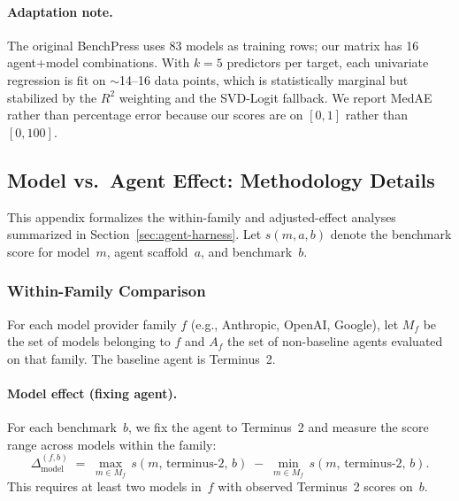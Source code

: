 \paragraph{Adaptation note.}
The original BenchPress uses 83 models as training rows; our matrix has 16
agent+model combinations.  With $k{=}5$ predictors per target, each univariate
regression is fit on $\sim$14--16 data points, which is statistically marginal
but stabilized by the $R^2$ weighting and the SVD-Logit fallback.  We report
MedAE rather than percentage error because our scores are on $[0,1]$ rather
than $[0,100]$.


\subsection{Model vs.\ Agent Effect: Methodology Details}
\label{app:model-vs-agent}

This appendix formalizes the within-family and adjusted-effect analyses
summarized in Section~\ref{sec:agent-harness}.  Let $s(m, a, b)$ denote the
benchmark score for model~$m$, agent scaffold~$a$, and benchmark~$b$.

\subsubsection{Within-Family Comparison}
\label{app:within-family}

For each model provider family $f$ (e.g., Anthropic, OpenAI, Google), let
$M_f$ be the set of models belonging to $f$ and $A_f$ the set of non-baseline
agents evaluated on that family.  The baseline agent is Terminus~2.

\paragraph{Model effect (fixing agent).}
For each benchmark~$b$, we fix the agent to Terminus~2 and measure the score
range across models within the family:
\begin{equation}
  \Delta_{\mathrm{model}}^{(f,b)}
  \;=\;
  \max_{m \in M_f}\, s(m,\,\text{terminus-2},\,b)
  \;-\;
  \min_{m \in M_f}\, s(m,\,\text{terminus-2},\,b).
  \label{eq:model-effect}
\end{equation}
This requires at least two models in~$f$ with observed Terminus~2 scores on~$b$.


